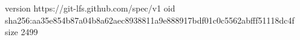 version https://git-lfs.github.com/spec/v1
oid sha256:aa35e854b87a04b8a62aec8938811a9e888917bdf01c0c5562abfff51118dc4f
size 2499

